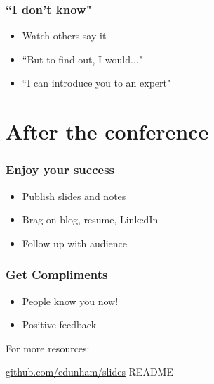 \documentclass{beamer}
\begin{document}
\begin{frame}[fragile]
\frametitle{``I don't know"}
\begin{itemize}[<+(1)->]
\item Watch others say it
\item ``But to find out, I would..."
\item ``I can introduce you to an expert"
\end{itemize}
\end{frame}

\section{After the conference}

\begin{frame}[fragile]
\tableofcontents[currentsection]
\end{frame}

\begin{frame}[fragile]
\frametitle{Enjoy your success}
\begin{itemize}[<+(1)->]
\item Publish slides and notes
\item Brag on blog, resume, LinkedIn
\item Follow up with audience
\end{itemize}
\end{frame}

\begin{frame}[fragile]
\frametitle{Get Compliments}
\begin{itemize}[<+(1)->]
\item People know you now!
\item Positive feedback
\end{itemize}
\end{frame}

\begin{frame}[fragile]
For more resources:

\url{github.com/edunham/slides} README
\end{frame}

\begin{frame}[fragile]
\titlepage
\end{frame}
\end{document}
